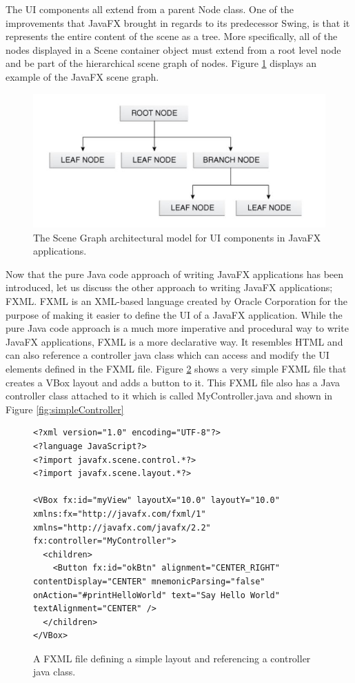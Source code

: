 The UI components all extend from a parent Node class. One of the improvements that JavaFX brought in regards to its predecessor Swing, is that it represents the entire content of the scene as a tree. More specifically, all of the nodes displayed in a Scene container object must extend from a root level node and be part of the hierarchical scene graph of nodes. Figure \ref{fig:javafxSceneGraph}  displays an example of the JavaFX scene graph.
\begin{figure}[th]
\centering
\includegraphics[scale=0.5]{Figures/javafx_scenegraph.JPG}
\caption[JavaFX Scene Graph]{The Scene Graph architectural model for UI components in JavaFX applications.}
\label{fig:javafxSceneGraph}
\end{figure}

Now that the pure Java code approach of writing JavaFX applications has been introduced, let us discuss the other approach to writing JavaFX applications; FXML. FXML is an XML-based language created by Oracle Corporation for the purpose of making it easier to define the UI of a JavaFX application. While the pure Java code approach is a much more imperative and procedural way to write JavaFX applications, FXML is a more declarative way. It resembles HTML and can also reference a controller java class which can access and modify the UI elements defined in the FXML file. Figure \ref{fig:simpleFXML} shows a very simple FXML file that creates a VBox layout and adds a button to it. This FXML file also has a Java controller class attached to it which is called MyController.java and shown in Figure \ref{fig:simpleController}

\begin{figure}[th]
\centering
\begin{lstlisting}
<?xml version="1.0" encoding="UTF-8"?>
<?language JavaScript?>
<?import javafx.scene.control.*?>
<?import javafx.scene.layout.*?>

<VBox fx:id="myView" layoutX="10.0" layoutY="10.0" xmlns:fx="http://javafx.com/fxml/1" xmlns="http://javafx.com/javafx/2.2" fx:controller="MyController">
  <children>
    <Button fx:id="okBtn" alignment="CENTER_RIGHT" contentDisplay="CENTER" mnemonicParsing="false" onAction="#printHelloWorld" text="Say Hello World" textAlignment="CENTER" />
  </children>
</VBox>
\end{lstlisting}
\caption[FXML example]{A FXML file defining a simple layout and referencing a controller java class.}
\label{fig:simpleFXML}
\end{figure}


